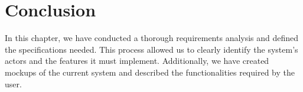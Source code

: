 







\section*{Conclusion}
In this chapter, we have conducted a thorough requirements analysis and defined the specifications needed.
This process allowed us to clearly identify the system's actors and the features it must implement. Additionally,
we have created mockups of the current system and described the functionalities required by the user.